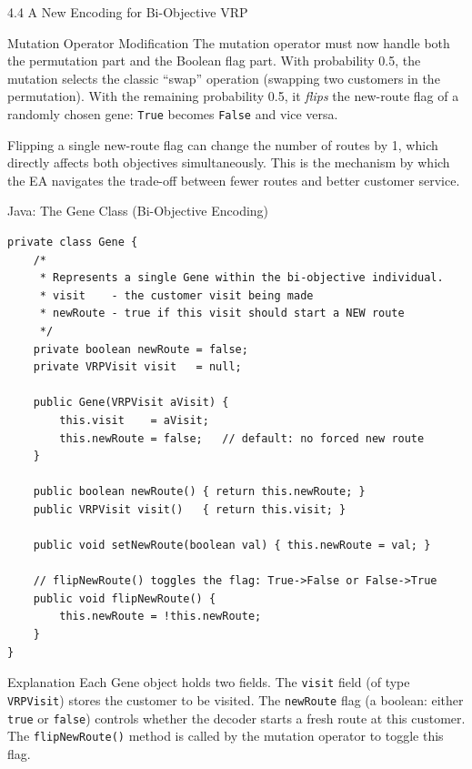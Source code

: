 \documentclass[aspectratio=169,10pt]{beamer}
\begin{document}
\begin{frame}[allowframebreaks]{4.4 A New Encoding for Bi-Objective VRP}
  \framebreak

  \begin{block}{Mutation Operator Modification}
    The mutation operator must now handle both the permutation part and the
    Boolean flag part.  With probability 0.5, the mutation selects the classic
    ``swap'' operation (swapping two customers in the permutation).  With the
    remaining probability 0.5, it \emph{flips} the new-route flag of a randomly
    chosen gene: \texttt{True} becomes \texttt{False} and vice versa.
  \end{block}

  Flipping a single new-route flag can change the number of routes by 1, which
  directly affects both objectives simultaneously.  This is the mechanism by which
  the EA navigates the trade-off between fewer routes and better customer service.

\end{frame}

\begin{frame}[fragile]{Java: The Gene Class (Bi-Objective Encoding)}
\begin{lstlisting}[language=JavaBook]
private class Gene {
    /*
     * Represents a single Gene within the bi-objective individual.
     * visit    - the customer visit being made
     * newRoute - true if this visit should start a NEW route
     */
    private boolean newRoute = false;
    private VRPVisit visit   = null;

    public Gene(VRPVisit aVisit) {
        this.visit    = aVisit;
        this.newRoute = false;   // default: no forced new route
    }

    public boolean newRoute() { return this.newRoute; }
    public VRPVisit visit()   { return this.visit; }

    public void setNewRoute(boolean val) { this.newRoute = val; }

    // flipNewRoute() toggles the flag: True->False or False->True
    public void flipNewRoute() {
        this.newRoute = !this.newRoute;
    }
}
\end{lstlisting}
\begin{exampleblock}{Explanation}
  Each Gene object holds two fields.  The \texttt{visit} field (of type
  \texttt{VRPVisit}) stores the customer to be visited.  The \texttt{newRoute}
  flag (a boolean: either \texttt{true} or \texttt{false}) controls whether the
  decoder starts a fresh route at this customer.  The \texttt{flipNewRoute()}
  method is called by the mutation operator to toggle this flag.
\end{exampleblock}
\end{frame}
\end{document}
